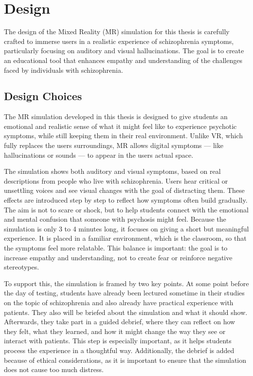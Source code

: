 \chapter{Design}
\label{ch:design}

The design of the Mixed Reality (MR) simulation for this thesis is carefully crafted to immerse users in a realistic experience of schizophrenia symptoms, particularly focusing on auditory and visual hallucinations. The goal is to create an educational tool that enhances empathy and understanding of the challenges faced by individuals with schizophrenia.

\section{Design Choices}

The MR simulation developed in this thesis is designed to give students an emotional and realistic sense of what it might feel like to experience psychotic symptoms, while still keeping them in their real environment. Unlike VR, which fully replaces the users surroundings, MR allows digital symptoms — like hallucinations or sounds — to appear in the users actual space. %

\vspace{1em}

The simulation shows both auditory and visual symptoms, based on real descriptions from people who live with schizophrenia. Users hear critical or unsettling voices and see visual changes with the goal of distracting them. These effects are introduced step by step to reflect how symptoms often build gradually. The aim is not to scare or shock, but to help students connect with the emotional and mental confusion that someone with psychosis might feel. Because the simulation is only 3 to 4 minutes long, it focuses on giving a short but meaningful experience. It is placed in a familiar environment, which is the classroom, so that the symptoms feel more relatable. This balance is important: the goal is to increase empathy and understanding, not to create fear or reinforce negative stereotypes. %

\vspace{1em}

To support this, the simulation is framed by two key points. At some point before the day of testing, students have already been lectured sometime in their studies on the topic of schizophrenia and also already have practical experience with patients. They also will be briefed about the simulation and what it should show. Afterwards, they take part in a guided debrief, where they can reflect on how they felt, what they learned, and how it might change the way they see or interact with patients. This step is especially important, as it helps students process the experience in a thoughtful way. Additionally, the debrief is added because of ethical considerations, as it is important to ensure that the simulation does not cause too much distress.

